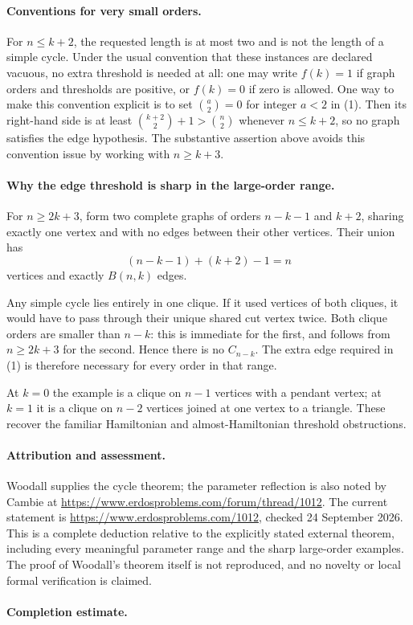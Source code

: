 \paragraph{Conventions for very small orders.}
For \(n\leq k+2\), the requested length is at most two and is not the length of a simple cycle. Under the usual convention that these instances are declared vacuous, no extra threshold is needed at all: one may write \(f(k)=1\) if graph orders and thresholds are positive, or \(f(k)=0\) if zero is allowed. One way to make this convention explicit is to set \(\binom{a}{2}=0\) for integer \(a<2\) in (1). Then its right-hand side is at least \(\binom{k+2}{2}+1>\binom n2\) whenever \(n\leq k+2\), so no graph satisfies the edge hypothesis. The substantive assertion above avoids this convention issue by working with \(n\geq k+3\).

\paragraph{Why the edge threshold is sharp in the large-order range.}
For \(n\geq2k+3\), form two complete graphs of orders \(n-k-1\) and \(k+2\), sharing exactly one vertex and with no edges between their other vertices. Their union has
\[
 (n-k-1)+(k+2)-1=n
\]
vertices and exactly \(B(n,k)\) edges.

Any simple cycle lies entirely in one clique. If it used vertices of both cliques, it would have to pass through their unique shared cut vertex twice. Both clique orders are smaller than \(n-k\): this is immediate for the first, and follows from \(n\geq2k+3\) for the second. Hence there is no \(C_{n-k}\). The extra edge required in (1) is therefore necessary for every order in that range.

At \(k=0\) the example is a clique on \(n-1\) vertices with a pendant vertex; at \(k=1\) it is a clique on \(n-2\) vertices joined at one vertex to a triangle. These recover the familiar Hamiltonian and almost-Hamiltonian threshold obstructions.

\paragraph{Attribution and assessment.}
Woodall supplies the cycle theorem; the parameter reflection is also noted by Cambie at \url{https://www.erdosproblems.com/forum/thread/1012}. The current statement is \url{https://www.erdosproblems.com/1012}, checked 24 September 2026. This is a complete deduction relative to the explicitly stated external theorem, including every meaningful parameter range and the sharp large-order examples. The proof of Woodall's theorem itself is not reproduced, and no novelty or local formal verification is claimed.

\paragraph{Completion estimate.}
